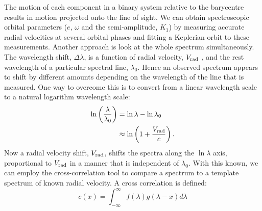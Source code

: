 The motion of each component in a binary system relative to the barycentre results in motion projected onto the line of sight. 
We can obtain spectroscopic orbital parameters ($e$, $\omega$ and the semi-amplitude, $K_1$) by measuring
%
%
accurate radial velocities at several orbital phases and fitting a Keplerian orbit to these measurements. Another approach is look at the whole spectrum simultaneously. The wavelength shift, $\Delta \lambda$, is a function of radial velocity, $V_{\rm rad}$ , and the rest wavelength of a particular spectral line, $\lambda_0$. Hence an observed spectrum appears to shift by different amounts depending on the wavelength of the line that is measured. One way to overcome this is to convert from a linear wavelength scale to a natural logarithm wavelength scale:
%
\begin{eqnarray}
    \ln \left( \frac{\lambda}{\lambda_0} \right) & = \ln \lambda - \ln \lambda_0 \\
    & \approx \ln \left(1 + \frac{V_{\rm rad}}{c} \right).
\end{eqnarray}
%
Now a radial velocity shift, $V_{\rm rad}$, shifts the spectra along the $\ln \lambda$ axis, proportional to $V_{\rm rad}$ in a manner that is independent of $ \lambda_0$. With this known, we can employ the cross-correlation tool to compare a spectrum to a template spectrum of known radial velocity. A cross correlation is defined:
%
\begin{equation}
    c(x) = \int_{-\infty}^{\infty} f(\lambda) g(\lambda - x) d \lambda
\end{equation}
%
